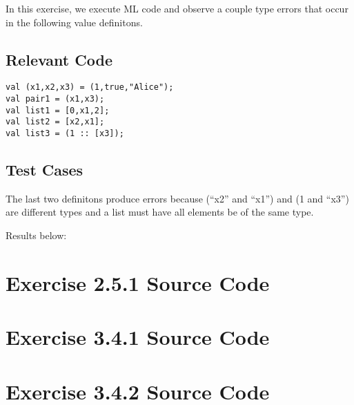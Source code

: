 \documentclass[letterpaper]{report}
\begin{document}
In this exercise, we execute ML code and observe a couple type errors that occur in the following
value definitons.

\section{Relevant Code}

\begin{lstlisting}
val (x1,x2,x3) = (1,true,"Alice");
val pair1 = (x1,x3);
val list1 = [0,x1,2];
val list2 = [x2,x1];
val list3 = (1 :: [x3]);
\end{lstlisting}


\section{Test Cases}

The last two definitons produce errors because (``x2'' and ``x1'') and (1 and ``x3'') 
are different types and a list must have all elements be of the same type. 

\noindent Results below:


\appendix

\chapter{Exercise 2.5.1 Source Code}
\label{cha:exerc-2.5.1-source}



\newpage

\chapter{Exercise 3.4.1 Source Code}
\label{cha:exerc-3.4.1-source}



\newpage

\chapter{Exercise 3.4.2 Source Code}
\label{cha:exerc-3.4.2-source}


\end{document}
